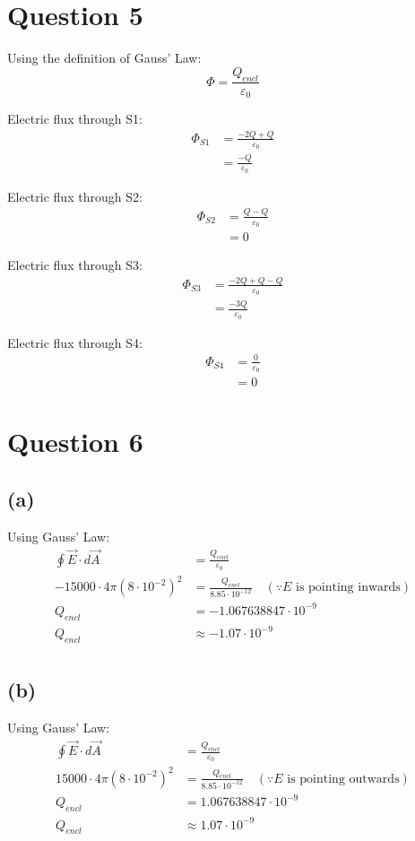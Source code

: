 \documentclass[11pt]{article}
\begin{document}
\section{Question 5}
\label{sec:org64993df}
Using the definition of Gauss' Law:
\[\Phi = \frac{Q_{encl}}{\varepsilon_0}\]

Electric flux through S1:
\begin{align*}
\Phi_{S1} &= \frac{-2Q + Q}{\varepsilon_0} \\
&= \frac{-Q}{\varepsilon_0}
\end{align*}

Electric flux through S2:
\begin{align*}
\Phi_{S2} &= \frac{Q - Q}{\varepsilon_0} \\
&= 0
\end{align*}

Electric flux through S3:
\begin{align*}
\Phi_{S3} &= \frac{-2Q + Q - Q}{\varepsilon_0} \\
&= \frac{-3Q}{\varepsilon_0}
\end{align*}

Electric flux through S4:
\begin{align*}
\Phi_{S4} &= \frac{0}{\varepsilon_0} \\
&= 0
\end{align*}


\section{Question 6}
\label{sec:orgeaf5621}

\subsection{(a)}
\label{sec:org48914ba}
Using Gauss' Law:
\begin{align*}
\oint \vec{E} \cdot d \vec{A} &= \frac{Q_{encl}}{\varepsilon_0} \\
-15000 \cdot 4 \pi (8 \cdot 10^{-2})^2 &= \frac{Q_{encl}}{8.85 \cdot 10^{-12}} \quad (\because E \text{ is pointing inwards}) \\
Q_{encl} &= -1.067638847 \cdot 10^{-9} \\
Q_{encl} &\approx -1.07 \cdot 10^{-9} \\
\end{align*}

\subsection{(b)}
\label{sec:orgf2e3d26}
Using Gauss' Law:
\begin{align*}
\oint \vec{E} \cdot d \vec{A} &= \frac{Q_{encl}}{\varepsilon_0} \\
15000 \cdot 4 \pi (8 \cdot 10^{-2})^2 &= \frac{Q_{encl}}{8.85 \cdot 10^{-12}} \quad (\because E \text{ is pointing outwards}) \\
Q_{encl} &= 1.067638847 \cdot 10^{-9} \\
Q_{encl} &\approx 1.07 \cdot 10^{-9} \\
\end{align*}
\end{document}
